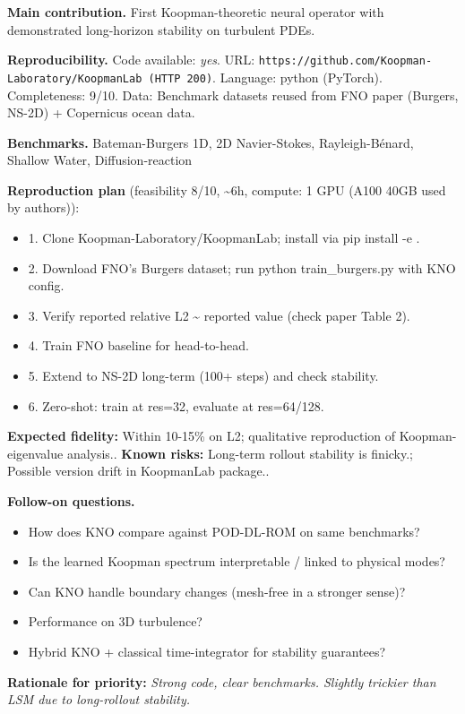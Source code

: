 \documentclass[10pt,letterpaper]{article}
\begin{document}
\textbf{Main contribution.} First Koopman-theoretic neural operator with demonstrated long-horizon stability on turbulent PDEs.

\textbf{Reproducibility.} Code available: \emph{yes}. URL: \texttt{https://github.com/Koopman-Laboratory/KoopmanLab (HTTP 200)}. Language: python (PyTorch). Completeness: 9/10. Data: Benchmark datasets reused from FNO paper (Burgers, NS-2D) + Copernicus ocean data.

\textbf{Benchmarks.} Bateman-Burgers 1D, 2D Navier-Stokes, Rayleigh-Bénard, Shallow Water, Diffusion-reaction

\textbf{Reproduction plan} (feasibility 8/10, \textasciitilde6h, compute: 1 GPU (A100 40GB used by authors)):
\begin{itemize}
\item 1. Clone Koopman-Laboratory/KoopmanLab; install via pip install -e .
\item 2. Download FNO's Burgers dataset; run python train\_burgers.py with KNO config.
\item 3. Verify reported relative L2 \~{} reported value (check paper Table 2).
\item 4. Train FNO baseline for head-to-head.
\item 5. Extend to NS-2D long-term (100+ steps) and check stability.
\item 6. Zero-shot: train at res=32, evaluate at res=64/128.
\end{itemize}
\textbf{Expected fidelity:} Within 10-15\% on L2; qualitative reproduction of Koopman-eigenvalue analysis.. \textbf{Known risks:} Long-term rollout stability is finicky.; Possible version drift in KoopmanLab package..

\textbf{Follow-on questions.}
\begin{itemize}
\item How does KNO compare against POD-DL-ROM on same benchmarks?
\item Is the learned Koopman spectrum interpretable / linked to physical modes?
\item Can KNO handle boundary changes (mesh-free in a stronger sense)?
\item Performance on 3D turbulence?
\item Hybrid KNO + classical time-integrator for stability guarantees?
\end{itemize}

\textbf{Rationale for priority:} \emph{Strong code, clear benchmarks. Slightly trickier than LSM due to long-rollout stability.}
\end{document}
